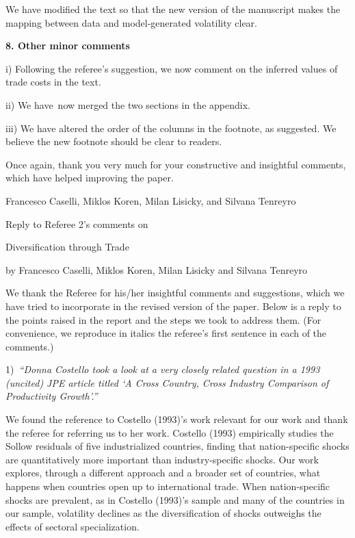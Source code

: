 \documentclass[12pt]{article}
\begin{document}
We have modified the text so that the new version of the manuscript makes
the mapping between data and model-generated volatility clear.

\bigskip 

\textbf{8. Other minor comments}

i) Following the referee's suggestion, we now comment on the inferred values
of trade costs in the text.

ii) We have\ now merged the two sections in the appendix.

iii) We have altered the order of the columns in the footnote, as suggested.
We believe the new footnote should be clear to readers.\bigskip

Once again, thank you very much for your constructive and insightful
comments, which have helped improving the paper.\medskip \medskip \bigskip

Francesco Caselli, Miklos Koren, Milan Lisicky, and Silvana Tenreyro

\thispagestyle{plain}\pagebreak

\begin{center}
\thispagestyle{plain}\setcounter{page}{1}Reply to Referee 2's comments on

{\Large Diversification through Trade}

by Francesco Caselli, Miklos Koren, Milan Lisicky and Silvana
Tenreyro\medskip

\bigskip
\end{center}

We thank the Referee for his/her insightful comments and suggestions, which
we have tried to incorporate in the revised version of the paper. Below is a
reply to the points raised in the report and the steps we took to address
them. (For convenience, we reproduce in italics the referee's first sentence
in each of the comments.)\bigskip

1)\textit{\ \textquotedblleft Donna Costello took a look at a very closely
related question in a 1993 (uncited) JPE article titled `A Cross Country,
Cross Industry Comparison of Productivity Growth'.\textquotedblright }

We found the reference to Costello (1993)'s work relevant for our work and
thank the referee for referring us to her work. Costello (1993) empirically
studies the Sollow residuals of five industrialized countries, finding that
nation-specific shocks are quantitatively more important than
industry-specific shocks. Our work explores, through a different approach
and a broader set of countries, what happens when countries open up to
international trade. When nation-specific shocks are prevalent, as in
Costello (1993)'s sample and many of the countries in our sample, volatility
declines as the diversification of shocks outweighs the effects of sectoral
specialization.\bigskip
\end{document}
